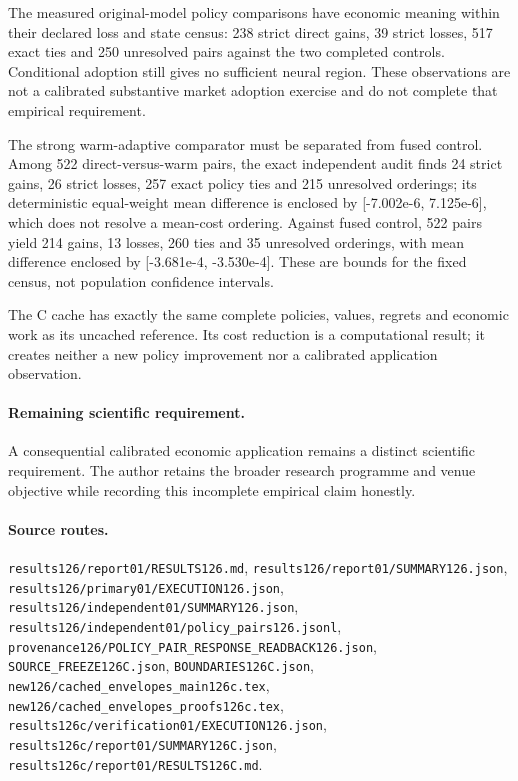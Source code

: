 The measured original-model policy comparisons have economic meaning within their declared loss and state census: 238 strict direct gains, 39 strict losses, 517 exact ties and 250 unresolved pairs against the two completed controls. Conditional adoption still gives no sufficient neural region. These observations are not a calibrated substantive market adoption exercise and do not complete that empirical requirement.\par
The strong warm-adaptive comparator must be separated from fused control. Among 522 direct-versus-warm pairs, the exact independent audit finds 24 strict gains, 26 strict losses, 257 exact policy ties and 215 unresolved orderings; its deterministic equal-weight mean difference is enclosed by [-7.002e-6, 7.125e-6], which does not resolve a mean-cost ordering. Against fused control, 522 pairs yield 214 gains, 13 losses, 260 ties and 35 unresolved orderings, with mean difference enclosed by [-3.681e-4, -3.530e-4]. These are bounds for the fixed census, not population confidence intervals.\par
The C cache has exactly the same complete policies, values, regrets and economic work as its uncached reference. Its cost reduction is a computational result; it creates neither a new policy improvement nor a calibrated application observation.\par

\paragraph{Remaining scientific requirement.} A consequential calibrated economic application remains a distinct scientific requirement. The author retains the broader research programme and venue objective while recording this incomplete empirical claim honestly.

\paragraph{Source routes.} \nolinkurl{results126/report01/RESULTS126.md}, \nolinkurl{results126/report01/SUMMARY126.json}, \nolinkurl{results126/primary01/EXECUTION126.json}, \nolinkurl{results126/independent01/SUMMARY126.json}, \nolinkurl{results126/independent01/policy_pairs126.jsonl}, \nolinkurl{provenance126/POLICY_PAIR_RESPONSE_READBACK126.json}, \nolinkurl{SOURCE_FREEZE126C.json}, \nolinkurl{BOUNDARIES126C.json}, \nolinkurl{new126/cached_envelopes_main126c.tex}, \nolinkurl{new126/cached_envelopes_proofs126c.tex}, \nolinkurl{results126c/verification01/EXECUTION126.json}, \nolinkurl{results126c/report01/SUMMARY126C.json}, \nolinkurl{results126c/report01/RESULTS126C.md}.

